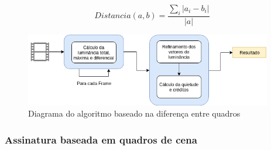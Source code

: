 \begin{equation}
  Distancia(a,b) = \frac{\sum_i|a_i - b_i|}{|a|}
  \label{eq:dist-manhattan}
\end{equation}

 \begin{figure}[h]
      \centering
      \includegraphics[width=0.96\textwidth]{dados/figuras/FrameDiff.png}
      \caption{Diagrama do algoritmo baseado na diferença entre quadros}
       	\label{fig:dia_framediff}
    \end{figure}  


    


 

%
%

\subsubsection{Assinatura baseada em quadros de cena}

